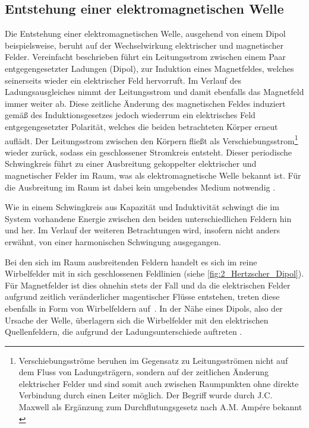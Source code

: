
\subsection{Entstehung einer elektromagnetischen Welle}\label{cha:2_sub_Entstehung_einer_Welle}

Die Entstehung einer elektromagnetischen Welle, ausgehend von einem Dipol beispielsweise, beruht auf der Wechselwirkung elektrischer und magnetischer Felder. Vereinfacht beschrieben führt ein Leitungsstrom zwischen einem Paar entgegengesetzter Ladungen (Dipol), zur Induktion eines Magnetfeldes, welches seinerseits wieder ein elektrischer Feld hervorruft. Im Verlauf des Ladungsausgleiches nimmt der Leitungsstrom und damit ebenfalls das Magnetfeld immer weiter ab. Diese zeitliche Änderung des magnetischen Feldes induziert gemäß des Induktionsgesetzes jedoch wiederrum ein elektrisches Feld entgegengesetzter Polarität, welches die beiden betrachteten Körper erneut auflädt. Der Leitungsstrom zwischen den Körpern fließt als Verschiebungsstrom\footnote{Verschiebungsströme beruhen im Gegensatz zu Leitungsströmen nicht auf dem Fluss von Ladungsträgern, sondern auf der zeitlichen Änderung elektrischer Felder und sind somit auch zwischen Raumpunkten ohne direkte Verbindung durch einen Leiter möglich. Der Begriff wurde durch J.C. Maxwell als Ergänzung zum Durchflutungsgesetz nach A.M. Ampére bekannt \cite{Feldtheorie_Begriffe}} wieder zurück, sodass ein geschlossener Stromkreis entsteht. Dieser periodische Schwingkreis führt zu einer Ausbreitung gekoppelter elektrischer und magnetischer Felder im Raum, was als elektromagnetische Welle bekannt ist. Für die Ausbreitung im Raum ist dabei kein umgebendes Medium notwendig \cite{EM_Schirmung}.
\par
\vspace{\linespace}
Wie in einem Schwingkreis aus Kapazität und Induktivität schwingt die im System vorhandene Energie zwischen den beiden unterschiedlichen Feldern hin und her. Im Verlauf der weiteren Betrachtungen wird, insofern nicht anders erwähnt, von einer harmonischen Schwingung ausgegangen.
\par
\vspace{\linespace}
Bei den sich im Raum ausbreitenden Feldern handelt es sich im reine Wirbelfelder mit in sich geschlossenen Feldlinien \cite{Feldtheorie_Begriffe} (siehe \Abb \ref{fig:2_Hertzscher_Dipol}). Für Magnetfelder ist dies ohnehin stets der Fall und da die elektrischen Felder aufgrund zeitlich veränderlicher magentischer Flüsse entstehen, treten diese ebenfalls in Form von Wirbelfeldern auf~\cite{EM_Schirmung, Feldtheorie_Begriffe}. In der Nähe eines Dipols, also der Ursache der Welle, überlagern sich die Wirbelfelder mit den elektrischen Quellenfeldern, die aufgrund der Ladungsunterschiede auftreten \cite{EM_Schirmung}. 
